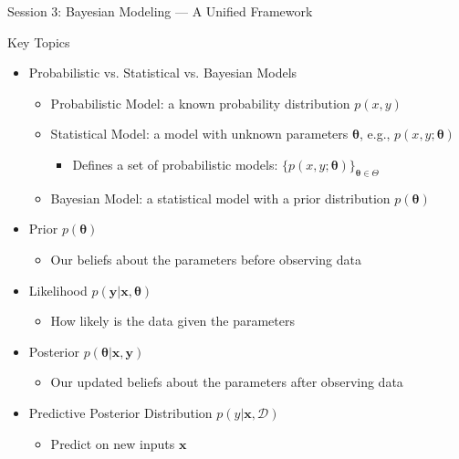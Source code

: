 \documentclass{beamer}
\begin{document}
\begin{frame}{Session 3: Bayesian Modeling — A Unified Framework}
  \begin{block}{Key Topics}
    \begin{itemize}
    \item Probabilistic vs. Statistical vs. Bayesian Models
      \begin{itemize}
      \item Probabilistic Model: a known probability distribution $p(x, y)$
      \item Statistical Model: a model with unknown parameters $\boldsymbol{\theta}$, e.g., $p(x, y ; \boldsymbol{\theta})$
        \begin{itemize}
        \item Defines a set of probabilistic models: $\{p(x, y ; \boldsymbol{\theta})\}_{\boldsymbol{\theta} \in \Theta}$
        \end{itemize}
      \item Bayesian Model: a statistical model with a prior distribution $p(\boldsymbol{\theta})$
      \end{itemize}
    \item Prior $p(\boldsymbol{\theta})$
      \begin{itemize}
      \item Our beliefs about the parameters before observing data
      \end{itemize}
    \item Likelihood $p(\boldsymbol{y} | \boldsymbol{x}, \boldsymbol{\theta})$
      \begin{itemize}
      \item How likely is the data given the parameters
      \end{itemize}
    \item Posterior $p(\boldsymbol{\theta} | \boldsymbol{x}, \boldsymbol{y})$
      \begin{itemize}
      \item Our updated beliefs about the parameters after observing data
      \end{itemize}
    \item Predictive Posterior Distribution $p(y|\boldsymbol{x}, \mathcal{D})$
      \begin{itemize}
      \item Predict on new inputs $\boldsymbol{x}$
      \end{itemize}
    \end{itemize}
  \end{block}
\end{frame}
\end{document}
